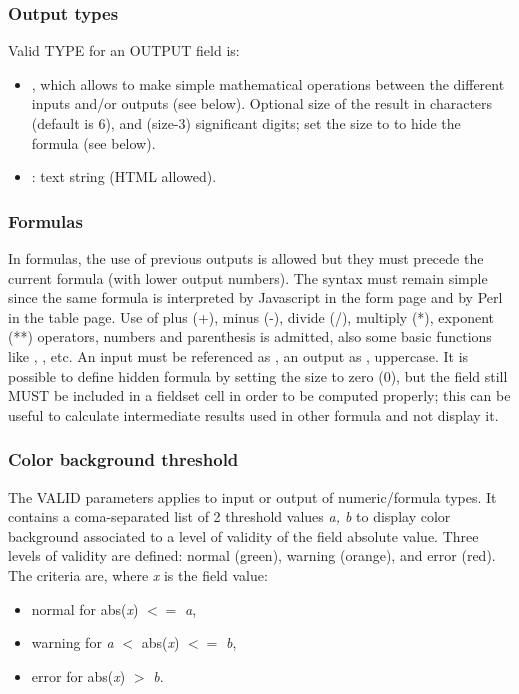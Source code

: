 \subsubsection{Output types}

Valid TYPE for an OUTPUT field is:
\begin{itemize}
	\item {}, which allows to make simple mathematical operations between the different inputs and/or outputs (see below). Optional size of the result in characters (default is 6), and (size-3) significant digits; set the size to  to hide the formula (see below).
	\item {} : text string (HTML allowed).
\end{itemize}

\subsubsection{Formulas}

In formulas, the use of previous outputs is allowed but they must precede the current formula (with lower output numbers). The syntax must remain simple since the same formula is interpreted by Javascript in the form page and by Perl in the table page. Use of plus (+), minus (-), divide (/), multiply (*), exponent (**) operators, numbers and parenthesis is admitted, also some basic functions like , , etc. An input must be referenced as , an output as , uppercase. It is possible to define hidden formula by setting the size to zero (0), but the field still MUST be included in a fieldset cell in order to be computed properly; this can be useful to calculate intermediate results used in other formula and not display it.
 
\subsubsection{Color background threshold}

The VALID parameters applies to input or output of numeric/formula types. It contains a coma-separated list of 2 threshold values {\it a, b} to display color background associated to a level of validity of the field absolute value. Three levels of validity are defined: normal (green), warning (orange), and error (red). The criteria are, where {\it x} is the field value:
\begin{itemize}
	\item normal for abs({\it x}) $<=$ {\it a},
	\item warning for {\it a} $<$ abs({\it x}) $<=$ {\it b},
	\item error for abs({\it x}) $>$ {\it b}.
\end{itemize}

